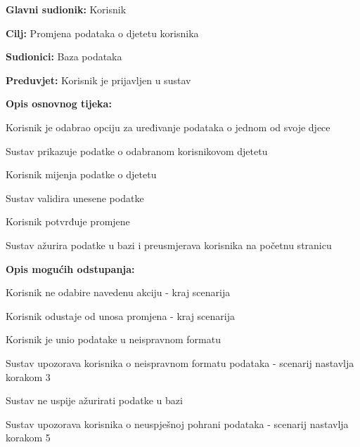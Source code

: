 					\noindent {}
					\begin{packed_item}
	
						\item \textbf{Glavni sudionik: }Korisnik
						\item  \textbf{Cilj:} Promjena podataka o djetetu korisnika
						\item  \textbf{Sudionici:} Baza podataka
						\item  \textbf{Preduvjet:} Korisnik je prijavljen u sustav
						\item  \textbf{Opis osnovnog tijeka:}
						
						\item[] \begin{packed_enum}
							\item Korisnik je odabrao opciju za uređivanje podataka o jednom od svoje djece
							\item Sustav prikazuje podatke o odabranom korisnikovom djetetu
							\item Korisnik mijenja podatke o djetetu
							\item Sustav validira unesene podatke
							\item Korisnik potvrđuje promjene
							\item Sustav ažurira podatke u bazi i preusmjerava korisnika na početnu stranicu
						\end{packed_enum}

						\item  \textbf{Opis mogućih odstupanja:}

						\item[] \begin{packed_item}
							\item[1.a] Korisnik ne odabire navedenu akciju - kraj scenarija
							\item[3.a] Korisnik odustaje od unosa promjena - kraj scenarija
							\item[4.a] Korisnik je unio podatake u neispravnom formatu
							\item[] \begin{packed_enum}
								\item Sustav upozorava korisnika o neispravnom formatu podataka - scenarij nastavlja korakom 3 
							\end{packed_enum}	
							\item[6.a] Sustav ne uspije ažurirati podatke u bazi
							\item[] \begin{packed_enum}
								\item Sustav upozorava korisnika o neuspješnoj pohrani podataka - scenarij nastavlja korakom 5
							\end{packed_enum}					
						\end{packed_item}
					\end{packed_item}
					
